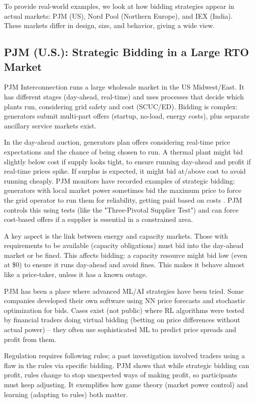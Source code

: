 \documentclass[conference]{IEEEtran}
\begin{document}
To provide real-world examples, we look at how bidding strategies appear in actual markets: PJM (US), Nord Pool (Northern Europe), and IEX (India). These markets differ in design, size, and behavior, giving a wide view.

\subsection{PJM (U.S.): Strategic Bidding in a Large RTO Market}

PJM Interconnection runs a large wholesale market in the US Midwest/East. It has different stages (day-ahead, real-time) and uses processes that decide which plants run, considering grid safety and cost (SCUC/ED). Bidding is complex: generators submit multi-part offers (startup, no-load, energy costs), plus separate ancillary service markets exist.

In the day-ahead auction, generators plan offers considering real-time price expectations and the chance of being chosen to run. A thermal plant might bid slightly below cost if supply looks tight, to ensure running day-ahead and profit if real-time prices spike. If surplus is expected, it might bid at/above cost to avoid running cheaply. PJM monitors have recorded examples of strategic bidding: generators with local market power sometimes bid the maximum price to force the grid operator to run them for reliability, getting paid based on costs \cite{PJM_MMU_Report_Specific}. PJM controls this using tests (like the "Three-Pivotal Supplier Test") and can force cost-based offers if a supplier is essential in a constrained area.

A key aspect is the link between energy and capacity markets. Those with requirements to be available (capacity obligations) must bid into the day-ahead market or be fined. This affects bidding: a capacity resource might bid low (even at \$0) to ensure it runs day-ahead and avoid fines. This makes it behave almost like a price-taker, unless it has a known outage.

PJM has been a place where advanced ML/AI strategies have been tried. Some companies developed their own software using NN price forecasts and stochastic optimization for bids. Cases exist (not public) where RL algorithms were tested by financial traders doing virtual bidding (betting on price differences without actual power) – they often use sophisticated ML to predict price spreads and profit from them.

Regulation requires following rules; a past investigation involved traders using a flaw in the rules via specific bidding. PJM shows that while strategic bidding can profit, rules change to stop unexpected ways of making profit, so participants must keep adjusting. It exemplifies how game theory (market power control) and learning (adapting to rules) both matter.
\end{document}
